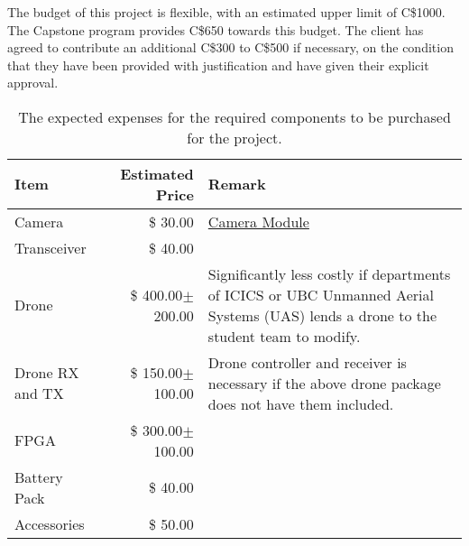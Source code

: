 The budget of this project is flexible, with an estimated upper limit of C\$1000. 
The Capstone program provides C\$650 towards this budget.
The client has agreed to contribute an additional C\$300 to C\$500 if necessary, on the condition that they have been provided with justification and have given their explicit approval.

\begin{table}[H]
    \centering
    \caption{The expected expenses for the required components to be purchased for the project.}
    \label{table:budget-items}

    \begin{tabular}{lrp{9cm}}

    \hline
    \textbf{Item} & \textbf{Estimated Price} & \textbf{Remark}\\
    \hline
    Camera&\$ \hfill30.00&\href{https://www.amazon.ca/Raspberry-Pi-Camera-Module-Megapixel/dp/B01ER2SKFS/ref=sr_1_3?crid=OOVX563QBZOF&keywords=raspberry+pi+camera&qid=1570511628&sprefix=raspbe\%2Caps\%2C238&sr=8-3}{Camera Module}\\
    Transceiver&\$ \hfill40.00&\\
    Drone&\$ \hfill400.00$\pm$200.00& Significantly less costly if departments of ICICS or UBC Unmanned Aerial Systems (UAS) lends a drone to the student team to modify.\\
    Drone RX and TX & \$ \hfill 150.00$\pm$100.00 & Drone controller and receiver is necessary if the above drone package does not have them included.\\
    FPGA&\$ \hfill 300.00$\pm$100.00&\\
    Battery Pack&\$ \hfill40.00&\\
    Accessories&\$ \hfill50.00&\\
    \hline

    \end{tabular} 
\end{table}
